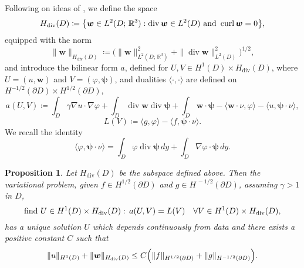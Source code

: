 \documentclass[10pt, a4paper, twoside, openright]{book}
\theoremstyle{definition}
\theoremstyle{plain}
\theoremstyle{plain}
\theoremstyle{plain}
\newtheorem{proposition}[subsection]{Proposition}
\theoremstyle{plain}
\theoremstyle{plain}
\theoremstyle{plain}
\theoremstyle{plain}
\theoremstyle{plain}
\DeclareMathOperator{\divergence}{div}
\DeclareMathOperator{\curl}{curl}
\let\phi\varphi
\begin{document}
Following on ideas of \cite{cakoni-colton-haddar:lsm}, we define the space
\begin{equation}
 H_{\divergence}(D)\coloneqq\bigl\{\bm{w}\in L^2(D;\,\mathbb{R}^3):\divergence\bm{w} \in L^2(D) \textup{ and } \curl\bm{w}=0 \bigr\},
\end{equation}
equipped with the norm
\begin{equation}
 \|\bm{w}\|_{H_{\divergence}(D)}\coloneqq\bigl(\|\bm{w}\|^2_{L^2(D;\,\mathbb{R}^3)} + \|\divergence\bm{w}\|^2_{L^2(D)}\bigr)^{1/2},
\end{equation}
and introduce the bilinear form $a$, defined for $U,V\in H^1(D)\times H_{\divergence}(D)$, where $U=(u,\bm{w})$ and $V=(\phi,\bm{\psi})$, 
and dualities $\langle\cdot,\cdot\rangle$ are defined on $H^{-1/2}(\partial D)\times H^{1/2}(\partial D)$,
\begin{equation}
 a(U,V)\coloneqq \int_D \gamma \nabla u\cdot\nabla \phi + \int_D\divergence \bm{w}\divergence\bm{\psi} + \int_D\bm{w}\cdot\bm{\psi} - \langle \bm{w}\cdot\nu, \phi \rangle- \langle u,\bm{\psi}\cdot\nu\rangle,
\end{equation}
\begin{equation}
 L(V)\coloneqq \langle g, \phi\rangle - \langle f, \bm{\psi}\cdot\nu\rangle.
\end{equation}
We recall the identity
\begin{equation}
 \label{eq:identity-duality}
 \langle\phi,\bm{\psi}\cdot\nu\rangle = \int_D\phi\divergence\bm\psi\,dy + \int_D\nabla\phi\cdot\bm{\psi}\,dy.
\end{equation}
\begin{proposition}
\label{prop:MITP-variational}
 Let $H_{\divergence}(D)$ be the subspace defined above. Then the variational problem, given $f\in H^{1/2}(\partial D)$ and $g\in H^{\,-1/2}(\partial D)$,
 assuming $\gamma>1$ in $D$,
 \begin{equation}
 \label{eq:MITP-variational}
  \textup{find }U\in H^1(D)\times H_{\divergence}(D):\,a(U,V)=L(V) \quad\forall V\in H^1(D)\times H_{\divergence}(D),
 \end{equation}
has a unique solution $U$ 
which depends continuously from data and there exists a positive constant $C$ such that
\begin{equation}
 \|u\|_{H^1(D)} + \|\bm w\|_{H_{\divergence}(D)}\leq C\Bigl(\|f\|_{H^{1/2}(\partial D)}+\|g\|_{H^{-1/2}(\partial D)}\Bigr).
\end{equation}
\end{proposition}
\end{document}
